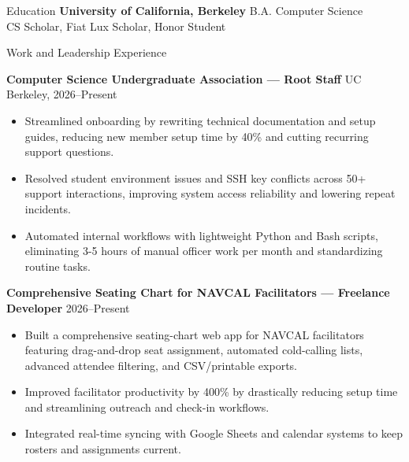 \documentclass{resume}
\begin{document}

\begin{rSection}{Education}
\textbf{University of California, Berkeley} 
B.A. Computer Science\\
CS Scholar, Fiat Lux Scholar, Honor Student
\end{rSection}


\begin{rSection}{Work and Leadership Experience}

\textbf{Computer Science Undergraduate Association — Root Staff} \hfill UC Berkeley, 2026–Present
\begin{itemize}
  \item Streamlined onboarding by rewriting technical documentation and setup guides, reducing new member setup time by 40\% and cutting recurring support questions.
  \item Resolved student environment issues and SSH key conflicts across 50+ support interactions, improving system access reliability and lowering repeat incidents.
  \item Automated internal workflows with lightweight Python and Bash scripts, eliminating 3-5 hours of manual officer work per month and standardizing routine tasks.
\end{itemize}

\textbf{Comprehensive Seating Chart for NAVCAL Facilitators — Freelance Developer} \hfill 2026–Present
\begin{itemize}
  \item Built a comprehensive seating-chart web app for NAVCAL facilitators featuring drag-and-drop seat assignment, automated cold-calling lists, advanced attendee filtering, and CSV/printable exports.
  \item Improved facilitator productivity by 400\% by drastically reducing setup time and streamlining outreach and check-in workflows.
  \item Integrated real-time syncing with Google Sheets and calendar systems to keep rosters and assignments current.
\end{itemize}


\end{rSection}
\end{document}
